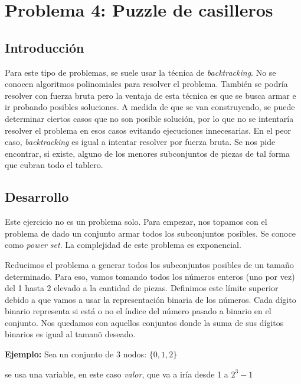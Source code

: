 \section{Problema 4: Puzzle de casilleros}

\subsection{Introducci\'on}

\quad Para este tipo de problemas, se suele usar la t\'ecnica de \textit{backtracking}. No se conocen algoritmos polinomiales para resolver el problema. Tambi\'en se podr\'ia resolver con fuerza bruta pero la ventaja de esta t\'ecnica es que se busca armar e ir probando posibles soluciones. A medida de que se van construyendo, se puede determinar ciertos casos que no son posible soluci\'on, por lo que no se intentar\'ia resolver el problema en esos casos evitando ejecuciones innecesarias. En el peor caso, \textit{backtracking} es igual a intentar resolver por fuerza bruta.
\quad Se nos pide encontrar, si existe, alguno de los menores subconjuntos de piezas de tal forma que cubran todo el tablero. 

\subsection{Desarrollo}

\quad Este ejercicio no es un problema solo. Para empezar, nos topamos con el problema de dado un conjunto armar todos los subconjuntos posibles. Se conoce como \textit{power set}. La complejidad de este problema es exponencial.

\quad Reducimos el problema a generar todos los subconjuntos posibles de un tama\~no determinado. Para eso, vamos tomando todos los n\'umeros enteros (uno por vez) del 1 hasta 2 elevado a la cantidad de piezas. Definimos este l\'imite superior debido a que vamos a usar la representaci\'on binaria de los n\'umeros. Cada d\'igito binario representa si est\'a o no el \'indice del n\'umero pasado a binario en el conjunto. Nos quedamos con aquellos conjuntos donde la suma de sus d\'igitos binarios es igual al taman\~o deseado.


\quad


\textbf{Ejemplo:} Sea un conjunto de 3 nodos: $ \lbrace 0 , 1 , 2 \rbrace $

\quad se usa una variable, en este caso \textit{valor}, que va a ir\'ia desde 1 a $ 2^3 - 1$

